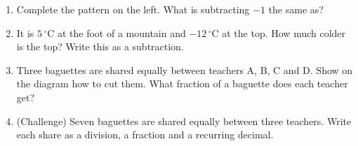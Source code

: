 \documentclass{beamer}
\newcommand{\ashow}[1]{\uncover<2->{\textcolor{red}{\small #1}}}
\newcommand{\tightlist}{%
  \setlength{\itemsep}{0pt}\setlength{\parskip}{0pt}\setlength{\topsep}{0pt}%
}
\newcommand{\dC}[1]{$#1\,^{\circ}$C}
\begin{document}
\begin{frame}
\begin{columns}[T,onlytextwidth]
\vspace{-1.5em}
\footnotesize
\begin{enumerate}\tightlist
{\setlength{\columnsep}{14pt}%
}
  \item Complete the pattern on the left. What is subtracting $-1$ the same as?
        \ashow{Adding $1$}
  \item It is \dC{5} at the foot of a mountain and \dC{-12} at the top. How much colder
        is the top? Write this as a subtraction.
        \ashow{$5-(-12)=17$ degrees}
  \item Three baguettes are shared equally between teachers A, B, C and D. Show on
        the diagram how to cut them. What fraction of a baguette does each teacher get?
        \ashow{Three quarters of a baguette}
  \item (Challenge) Seven baguettes are shared equally between three teachers. Write
        each share as a division, a fraction and a recurring decimal.
        \ashow{$7\div3=\dfrac73=2.\dot{3}$}
\end{enumerate}
\end{columns}
\end{frame}
\end{document}
